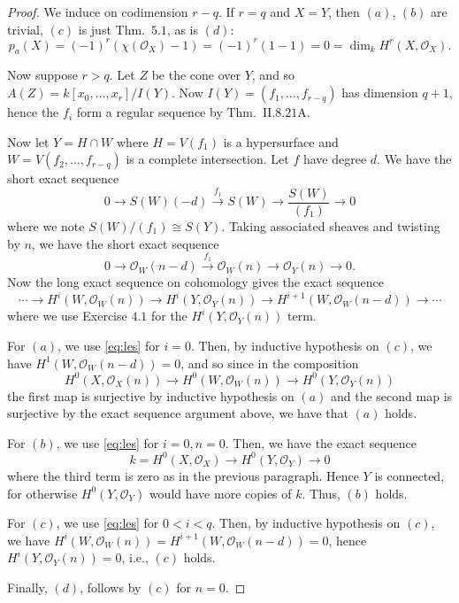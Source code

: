 \documentclass[10pt]{article}
\theoremstyle{definition}
\theoremstyle{remark}
\numberwithin{equation}{section}
\numberwithin{figure}{subsubsection}
\newcommand{\OO}{\mathcal{O}}
\begin{document}
\begin{proof}
  We induce on codimension $r - q$. If $r=q$ and $X = Y$, then $(a)$, $(b)$ are
  trivial, $(c)$ is just Thm.\ $5.1$, as is $(d)$:
  \begin{equation*}
    p_a(X) = (-1)^r(\chi(\OO_X) - 1) = (-1)^r(1-1) = 0 = \dim_k H^r(X,\OO_X).
  \end{equation*}
  \par Now suppose $r > q$.
  Let $Z$ be the cone over $Y$, and so $A(Z) = k[x_0,\ldots,x_r]/I(Y)$. Now
  $I(Y) = (f_1,\ldots,f_{r-q})$ has dimension $q+1$, hence the $f_i$ form a
  regular sequence by Thm.\ II.$8.21$A.
  \par Now let $Y = H \cap W$ where $H = V(f_1)$ is a hypersurface and
  $W = V(f_2,\ldots,f_{r-q})$ is a complete intersection.
  Let $f$ have degree $d$. We have the short exact sequence
  \begin{equation*}
    0 \longrightarrow S(W)(-d) \overset{f_1}{\longrightarrow} S(W)
    \longrightarrow \frac{S(W)}{(f_1)} \longrightarrow 0
  \end{equation*}
  where we note $S(W)/(f_1) \cong S(Y)$. Taking associated sheaves and twisting
  by $n$, we have the short exact sequence
  \begin{equation*}
    0 \longrightarrow \OO_W(n-d) \overset{f_1}{\longrightarrow} \OO_W(n)
    \longrightarrow \OO_Y(n) \longrightarrow 0.
  \end{equation*}
  Now the long exact sequence on cohomology gives the exact sequence
  \begin{equation}\label{eq:les}
    \cdots \longrightarrow H^{i}(W,\OO_W(n))
    \longrightarrow H^i(Y,\OO_Y(n)) \longrightarrow H^{i+1}(W,\OO_W(n-d))
    \longrightarrow \cdots
  \end{equation}
  where we use Exercise $4.1$ for the $H^i(Y,\OO_Y(n))$ term.
  \par For $(a)$, we use \eqref{eq:les} for $i=0$. Then, by inductive
  hypothesis on $(c)$, we have $H^1(W,\OO_W(n-d)) = 0$, and so since in the
  composition
  \begin{equation*}
    H^0(X,\OO_X(n)) \longrightarrow H^0(W,\OO_W(n)) \longrightarrow H^0(Y,\OO_Y(n))
  \end{equation*}
  the first map is surjective by inductive hypothesis on $(a)$ and the second
  map is surjective by the exact sequence argument above, we have that $(a)$
  holds.
  \par For $(b)$, we use \eqref{eq:les} for $i=0,n=0$. Then, we have the exact
  sequence
  \begin{equation*}
    k = H^0(X,\OO_X) \longrightarrow H^0(Y,\OO_Y) \longrightarrow 0
  \end{equation*}
  where the third term is zero as in the previous paragraph.
  Hence $Y$ is connected, for otherwise $H^0(Y,\OO_Y)$ would have more copies of
  $k$. Thus, $(b)$ holds.
  \par For $(c)$, we use \eqref{eq:les} for $0 < i < q$. Then, 
  by inductive hypothesis on $(c)$, we have
  $H^i(W,\OO_W(n)) = H^{i+1}(W,\OO_W(n-d)) = 0$, hence $H^i(Y,\OO_Y(n)) = 0$,
  i.e., $(c)$ holds.
  \par Finally, $(d)$, follows by $(c)$ for $n=0$.
\end{proof}
\end{document}

